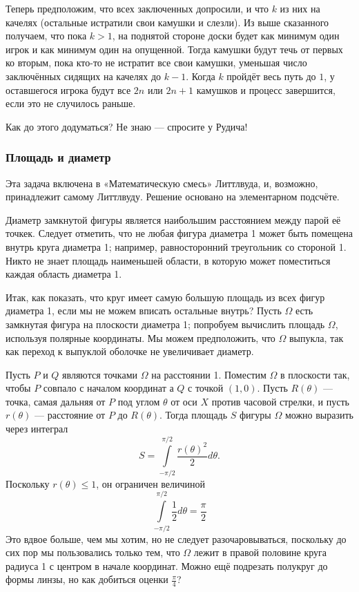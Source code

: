 Теперь предположим, что всех заключенных допросили, и что $k$ из них на качелях (остальные истратили свои камушки и слезли).
Из выше сказанного получаем, что пока $k>1$, на поднятой стороне доски будет как минимум один игрок и как минимум один на опущенной.
Тогда камушки будут течь от первых ко вторым, пока кто-то не истратит все свои камушки, уменьшая число заключённых сидящих на качелях до $k-1$.
Когда $k$ пройдёт весь путь до $1$, у оставшегося игрока будут все $2n$ или $2n+1$ камушков и процесс завершится, если это не случилось раньше.
\heart

Как до этого додуматься?
Не  знаю --- спросите у Рудича!

\subsubsection*{Площадь и диаметр}

Эта задача включена в «Математическую смесь» Литтлвуда, и, возможно, принадлежит самому Литтлвуду.
Решение основано на элементарном подсчёте. %

Диаметр замкнутой фигуры является наибольшим расстоянием между парой её точкек.
Следует отметить, что не любая фигура диаметра 1 может быть помещена внутрь круга диаметра 1;
например, равносторонний треугольник со стороной 1.
Никто не знает площадь наименьшей области, в которую может поместиться каждая область диаметра 1. %

Итак, как показать, что круг имеет самую большую площадь из всех фигур диаметра 1, если мы не можем вписать остальные внутрь?
Пусть $\Omega$ есть замкнутая фигура на плоскости диаметра 1; попробуем вычислить площадь $\Omega$, используя полярные координаты.
Мы можем предположить, что $\Omega$ выпукла, так как переход к выпуклой оболочке не увеличивает диаметр.

Пусть $P$ и $Q$ являются точками $\Omega$ на расстоянии 1.
Поместим $\Omega$ в плоскости так, чтобы $P$ совпало с началом координат а $Q$ с точкой $(1,0)$.
Пусть $R(\theta)$ --- точка, самая дальняя от $P$ под углом $\theta$ от оси $X$ против часовой стрелки, и пусть $r(\theta)$ --- расстояние от $P$ до $R(\theta)$.
Тогда площадь $S$ фигуры $\Omega$ можно выразить через интеграл
\[S=\int\limits_{-\pi/2}^{\pi/2}\frac{r(\theta)^2}{2}d\theta.\]
Поскольку $r(\theta) \le 1$, он ограничен величиной
\[\int\limits_{-\pi/2}^{\pi/2}\frac{1}{2}d\theta=\frac\pi2\]
Это вдвое больше, чем мы хотим, но не следует разочаровываться, поскольку до сих пор мы пользовались только тем, что $\Omega$ лежит в правой половине круга радиуса 1 с центром в начале координат.
Можно ещё подрезать полукруг до формы линзы, но как добиться оценки $\tfrac\pi4$?

